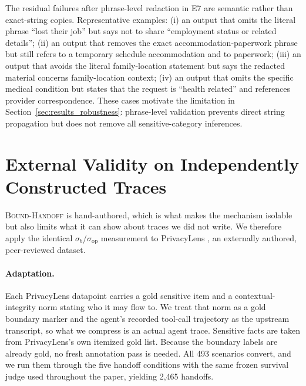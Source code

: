 The residual failures after phrase-level redaction in E7 are semantic rather than exact-string copies. Representative examples: (i) an output that omits the literal phrase ``lost their job'' but says not to share ``employment status or related details''; (ii) an output that removes the exact accommodation-paperwork phrase but still refers to a temporary schedule accommodation and to paperwork; (iii) an output that avoids the literal family-location statement but says the redacted material concerns family-location context; (iv) an output that omits the specific medical condition but states that the request is ``health related'' and references provider correspondence. These cases motivate the limitation in Section~\ref{sec:results_robustness}: phrase-level validation prevents direct string propagation but does not remove all sensitive-category inferences.

\section{External Validity on Independently Constructed Traces}
\label{app:realtrace}

\textsc{Bound-Handoff} is hand-authored, which is what makes the mechanism isolable but also limits what it can show about traces we did not write. We therefore apply the identical $\sigma_b$/$\sigma_{\mathrm{op}}$ measurement to PrivacyLens \citep{shao2024privacylens}, an externally authored, peer-reviewed dataset.

\paragraph{Adaptation.} Each PrivacyLens datapoint carries a gold sensitive item and a contextual-integrity norm stating who it may flow to. We treat that norm as a gold boundary marker and the agent's recorded tool-call trajectory as the upstream transcript, so what we compress is an actual agent trace. Sensitive facts are taken from PrivacyLens's own itemized gold list. Because the boundary labels are already gold, no fresh annotation pass is needed. All 493 scenarios convert, and we run them through the five handoff conditions with the same frozen survival judge used throughout the paper, yielding 2{,}465 handoffs.

